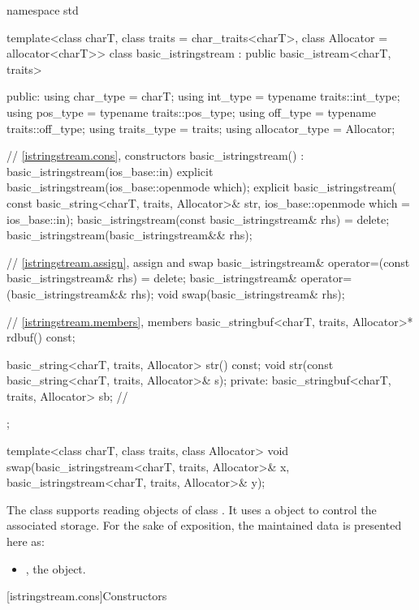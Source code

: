 %
\begin{codeblock}
namespace std {
  template<class charT, class traits = char_traits<charT>,
           class Allocator = allocator<charT>>
  class basic_istringstream : public basic_istream<charT, traits> {
  public:
    using char_type      = charT;
    using int_type       = typename traits::int_type;
    using pos_type       = typename traits::pos_type;
    using off_type       = typename traits::off_type;
    using traits_type    = traits;
    using allocator_type = Allocator;

    // \ref{istringstream.cons}, constructors
    basic_istringstream() : basic_istringstream(ios_base::in) {}
    explicit basic_istringstream(ios_base::openmode which);
    explicit basic_istringstream(
      const basic_string<charT, traits, Allocator>& str,
      ios_base::openmode which = ios_base::in);
    basic_istringstream(const basic_istringstream& rhs) = delete;
    basic_istringstream(basic_istringstream&& rhs);

    // \ref{istringstream.assign}, assign and swap
    basic_istringstream& operator=(const basic_istringstream& rhs) = delete;
    basic_istringstream& operator=(basic_istringstream&& rhs);
    void swap(basic_istringstream& rhs);

    // \ref{istringstream.members}, members
    basic_stringbuf<charT, traits, Allocator>* rdbuf() const;

    basic_string<charT, traits, Allocator> str() const;
    void str(const basic_string<charT, traits, Allocator>& s);
  private:
    basic_stringbuf<charT, traits, Allocator> sb; // \expos
  };

  template<class charT, class traits, class Allocator>
    void swap(basic_istringstream<charT, traits, Allocator>& x,
              basic_istringstream<charT, traits, Allocator>& y);
}
\end{codeblock}

\pnum
The class
supports reading objects of class
.
It uses a
object to control the associated storage.
For the sake of exposition, the maintained data is presented here as:
\begin{itemize}
\item
{}, the  object.
\end{itemize}

[istringstream.cons]{Constructors}

